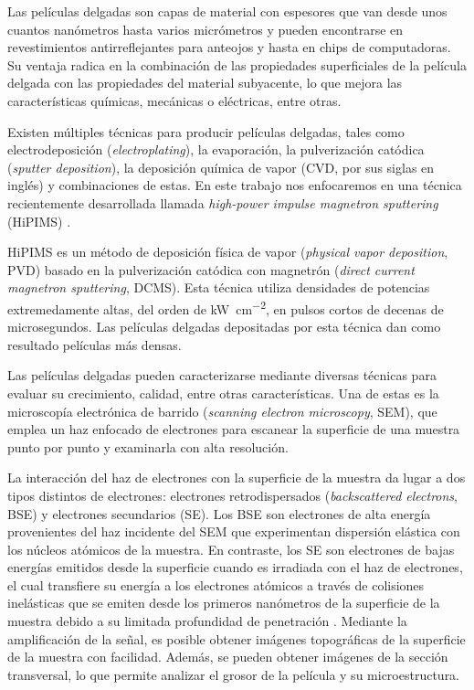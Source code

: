 \documentclass[12pt]{IEEEtran}
\begin{document}
Las películas delgadas son capas de material con espesores que van desde unos cuantos nanómetros hasta varios micrómetros y pueden encontrarse en revestimientos antirreflejantes para anteojos y hasta en chips de computadoras. Su ventaja radica en la combinación de las propiedades superficiales de la película delgada con las propiedades del material subyacente, lo que mejora las características químicas, mecánicas o eléctricas, entre otras.

Existen múltiples técnicas para producir películas delgadas, tales como electrodeposición (\emph{electroplating}), la evaporación, la pulverización catódica (\emph{sputter deposition}), la deposición química de vapor  (CVD, por sus siglas en inglés) y combinaciones de estas. En este trabajo nos enfocaremos en una técnica recientemente desarrollada llamada \emph{high-power impulse magnetron sputtering} (HiPIMS) \cite{lundinHiPIMSProcess2010}.

HiPIMS es un método de deposición física de vapor (\emph{physical vapor deposition}, PVD) basado en la pulverización catódica con magnetrón (\emph{direct current magnetron sputtering}, DCMS). Esta técnica utiliza densidades de potencias extremedamente altas, del orden de \unit{\kW\per\cm^{2}}, en pulsos cortos de decenas de microsegundos. Las películas delgadas depositadas por esta técnica dan como resultado películas más densas.

Las películas delgadas pueden caracterizarse mediante diversas técnicas para evaluar su crecimiento, calidad, entre otras características. Una de estas es la microscopía electrónica de barrido (\emph{scanning electron microscopy}, SEM), que emplea un haz enfocado de electrones para escanear la superficie de una muestra punto por punto y examinarla con alta resolución.

La interacción del haz de electrones con la superficie de la muestra da lugar a dos tipos distintos de electrones: electrones retrodispersados (\emph{backscattered electrons}, BSE) y electrones secundarios (SE). Los BSE son electrones de alta energía provenientes del haz incidente del SEM que experimentan dispersión elástica con los núcleos atómicos de la muestra. En contraste, los SE son electrones de bajas energías emitidos desde la superficie cuando es irradiada con el haz de electrones, el cual transfiere su energía a los electrones atómicos a través de colisiones inelásticas que se emiten desde los primeros nanómetros de la superficie de la muestra debido a su limitada profundidad de penetración \cite{WhichElectronDetector2023,infoInterpretingImagesScanning2022}.
Mediante la amplificación de la señal, es posible obtener imágenes topográficas de la superficie de la muestra con facilidad. Además, se pueden obtener imágenes de la sección transversal, lo que permite analizar el grosor de la película y su microestructura.
\end{document}
